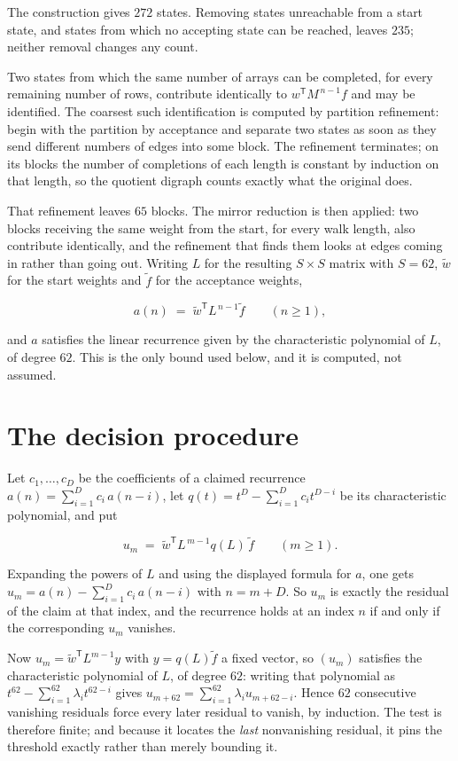 \documentclass[11pt]{article}
\theoremstyle{definition}
\begin{document}
The construction gives $272$ states. Removing states unreachable from a start state, and states from which no accepting state can be reached, leaves $235$; neither removal changes any count.

Two states from which the same number of arrays can be completed, for every remaining number of rows, contribute identically to $w^{\mathsf T}M^{\,n-1}f$ and may be identified. The coarsest such identification is computed by partition refinement: begin with the partition by acceptance and separate two states as soon as they send different numbers of edges into some block. The refinement terminates; on its blocks the number of completions of each length is constant by induction on that length, so the quotient digraph counts exactly what the original does.

That refinement leaves $65$ blocks. The mirror reduction is then applied: two blocks receiving the same weight from the start, for every walk length, also contribute identically, and the refinement that finds them looks at edges coming in rather than going out. Writing $L$ for the resulting $S \times S$ matrix with $S = 62$, $\tilde w$ for the start weights and $\tilde f$ for the acceptance weights,

\[a(n) \;=\; \tilde w^{\mathsf T} L^{\,n-1} \tilde f \qquad (n \ge 1),\]

and $a$ satisfies the linear recurrence given by the characteristic polynomial of $L$, of degree $62$. This is the only bound used below, and it is computed, not assumed.

\section{The decision procedure}

Let $c_1,\dots,c_D$ be the coefficients of a claimed recurrence $a(n) = \sum_{i=1}^{D} c_i\,a(n-i)$, let $q(t) = t^{D} - \sum_{i=1}^{D} c_i t^{D-i}$ be its characteristic polynomial, and put

\[u_m \;=\; \tilde w^{\mathsf T} L^{\,m-1} q(L)\,\tilde f \qquad (m \ge 1).\]

Expanding the powers of $L$ and using the displayed formula for $a$, one gets $u_m = a(n) - \sum_{i=1}^{D} c_i\,a(n-i)$ with $n = m + D$. So $u_m$ is exactly the residual of the claim at that index, and the recurrence holds at an index $n$ if and only if the corresponding $u_m$ vanishes.

Now $u_m = \tilde w^{\mathsf T} L^{m-1} y$ with $y = q(L)\tilde f$ a fixed vector, so $(u_m)$ satisfies the characteristic polynomial of $L$, of degree $62$: writing that polynomial as $t^{62} - \sum_{i=1}^{62} \lambda_i t^{62-i}$ gives $u_{m+62} = \sum_{i=1}^{62} \lambda_i u_{m+62-i}$. Hence $62$ consecutive vanishing residuals force every later residual to vanish, by induction. The test is therefore finite; and because it locates the {\itshape last} nonvanishing residual, it pins the threshold exactly rather than merely bounding it.
\end{document}
